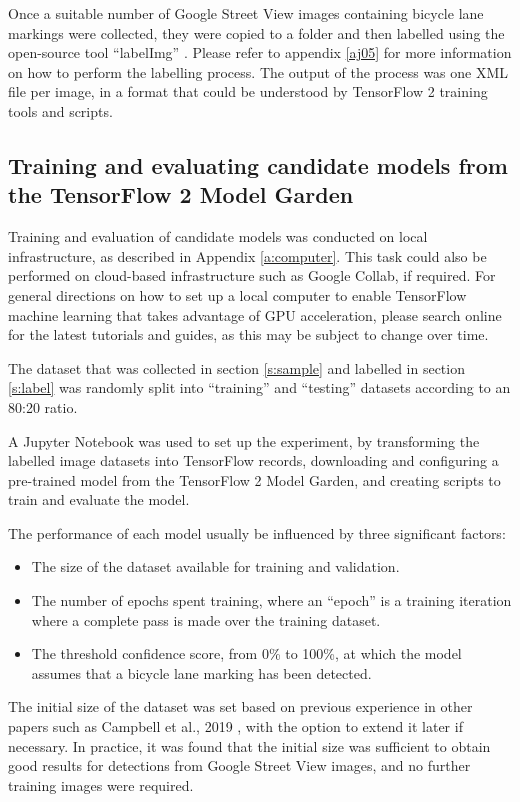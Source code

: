 \documentclass[11pt,twoside]{report}
\begin{document}
Once a suitable number of Google Street View images containing bicycle lane markings were collected, they were copied to a folder and then labelled using the open-source tool ``labelImg'' \cite{labelImg}.  Please refer to appendix \ref{aj05} for more information on how to perform the labelling process.  The output of the process was one XML file per image, in a format that could be understood by TensorFlow 2 training tools and scripts.

\subsection{Training and evaluating candidate models from the TensorFlow 2 Model Garden}

Training and evaluation of candidate models was conducted on local infrastructure, as described in Appendix \ref{a:computer}.  This task could also be performed on cloud-based infrastructure such as Google Collab, if required.  For general directions on how to set up a local computer to enable TensorFlow machine learning that takes advantage of GPU acceleration, please search online for the latest tutorials and guides, as this may be subject to change over time.

The dataset that was collected in section \ref{s:sample} and labelled in section \ref{s:label} was randomly split into ``training'' and ``testing'' datasets according to an 80:20 ratio.

A Jupyter Notebook was used to set up the experiment, by transforming the labelled image datasets into TensorFlow records, downloading and configuring a pre-trained model from the TensorFlow 2 Model Garden, and creating scripts to train and evaluate the model.

The performance of each model usually be influenced by three significant factors:

\begin{itemize}
\item{The size of the dataset available for training and validation.}
\item{The number of epochs spent training, where an ``epoch'' is a training iteration where a complete pass is made over the training dataset.}
\item{The threshold confidence score, from 0\% to 100\%, at which the model assumes that a bicycle lane marking has been detected.}
\end{itemize}

The initial size of the dataset was set based on previous experience in other papers such as Campbell et al., 2019 \cite{CAMPBELL2019101350}, with the option to extend it later if necessary.  In practice, it was found that the initial size was sufficient to obtain good results for detections from Google Street View images, and no further training images were required.
\end{document}
